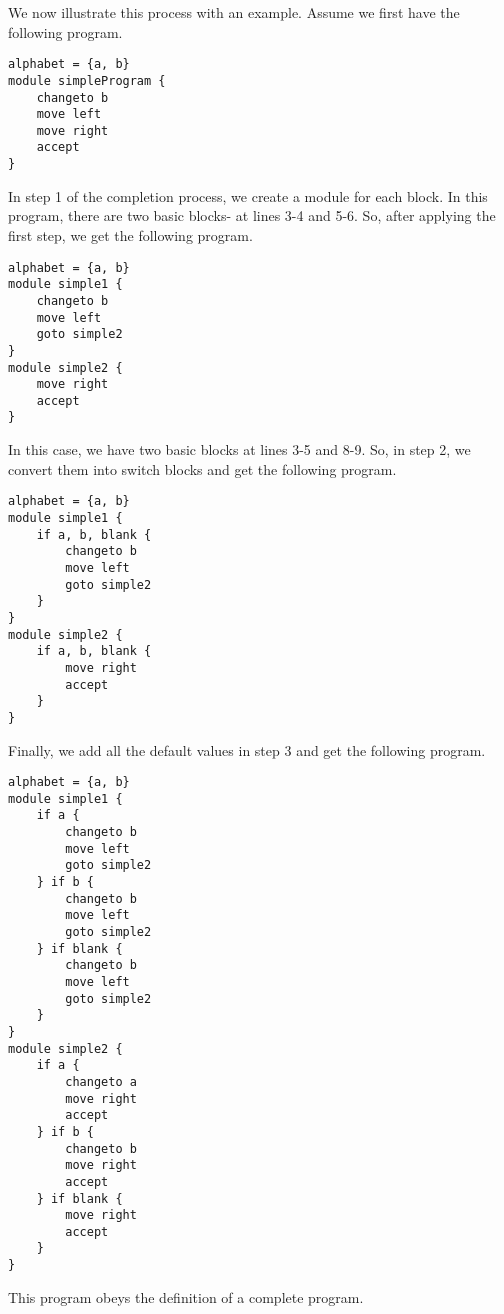 \documentclass{article}
\begin{document}
    We now illustrate this process with an example. Assume we first have the following program.
\begin{lstlisting}[language=TML]
alphabet = {a, b}
module simpleProgram {
    changeto b
    move left
    move right
    accept
}
\end{lstlisting}
    In step 1 of the completion process, we create a module for each block. In this program, there are two basic blocks- at lines 3-4 and 5-6. So, after applying the first step, we get the following program.
\begin{lstlisting}[language=TML]
alphabet = {a, b}
module simple1 {
    changeto b
    move left
    goto simple2
}
module simple2 {
    move right
    accept
}
\end{lstlisting}
    In this case, we have two basic blocks at lines 3-5 and 8-9. So, in step 2, we convert them into switch blocks and get the following program.
\begin{lstlisting}[language=TML]
alphabet = {a, b}
module simple1 {
    if a, b, blank {
        changeto b
        move left
        goto simple2
    }
}
module simple2 {
    if a, b, blank {
        move right
        accept
    }
}
\end{lstlisting}
    Finally, we add all the default values in step 3 and get the following program.
\begin{lstlisting}[language=TML]
alphabet = {a, b}
module simple1 {
    if a {
        changeto b
        move left
        goto simple2
    } if b {
        changeto b
        move left
        goto simple2
    } if blank {
        changeto b
        move left
        goto simple2
    }
}
module simple2 {
    if a {
        changeto a
        move right
        accept
    } if b {
        changeto b
        move right
        accept
    } if blank {
        move right
        accept
    }
}
\end{lstlisting}
    This program obeys the definition of a complete program.
\end{document}
